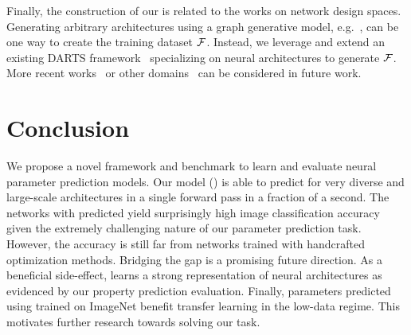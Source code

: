 Finally, the construction of our \dataset is related to the works on network design spaces. Generating arbitrary architectures using a graph generative model, e.g.~\citep{yu2019dag,guo2020systematic,you2020graph}, can be one way to create the training dataset $\mathcal{F}$. Instead, we leverage and extend an existing DARTS framework~\citep{liu2018darts} specializing on neural architectures to generate $\mathcal{F}$. 
More recent works~\citep{radosavovic2020designing} or other domains~\citep{you2020design} can be considered in future work.


\section{Conclusion}
We propose a novel framework and benchmark to learn and evaluate neural parameter prediction models. Our model (\ghnours) is able to predict \params for very diverse and large-scale architectures in a single forward pass in a fraction of a second. The networks with predicted \params yield surprisingly high image classification accuracy given the extremely challenging nature of our parameter prediction task. However, the accuracy is still far from networks trained with handcrafted optimization methods. Bridging the gap is a promising future direction. As a beneficial side-effect, \ghnours learns a strong representation of neural architectures as evidenced by our property prediction evaluation. Finally, parameters predicted using \ghnours trained on ImageNet benefit transfer learning in the low-data regime. This motivates further research towards solving our task.
